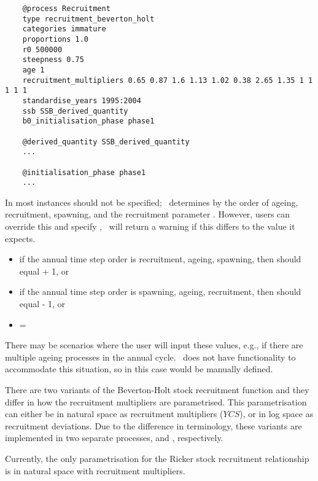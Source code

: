 {\small{\begin{verbatim}
	@process Recruitment
	type recruitment_beverton_holt
	categories immature
	proportions 1.0
	r0 500000
	steepness 0.75
	age 1
	recruitment_multipliers 0.65 0.87 1.6 1.13 1.02 0.38 2.65 1.35 1 1 1 1 1
	standardise_years 1995:2004
	ssb SSB_derived_quantity
	b0_initialisation_phase phase1
	
	@derived_quantity SSB_derived_quantity
	...
	
	@initialisation_phase phase1
	...
\end{verbatim}}}

In most instances  should not be specified; \CNAME\ determines  by the order of ageing, recruitment, spawning, and the recruitment parameter . However, users can override this and specify , \CNAME\ will return a warning if this differs to the value it expects.

\begin{itemize}
	\item if the annual time step order is recruitment, ageing, spawning, then  should equal  + 1, or
	\item if the annual time step order is spawning, ageing, recruitment, then  should equal  - 1, or
	\item {} = 
\end{itemize}

There may be scenarios where the user will input these values, e.g., if there are multiple ageing processes in the annual cycle. \CNAME\ does not have functionality to accommodate this situation, so in this case  would be manually defined.

There are two variants of the Beverton-Holt stock recruitment function and they differ in how the recruitment multipliers are parametrised. This parametrisation can either be in natural space as recruitment multipliers ($YCS$), or in log space as recruitment deviations. Due to the difference in terminology, these variants are implemented in two separate processes,  and , respectively.

Currently, the only parametrisation for the Ricker stock recruitment relationship is in natural space with recruitment multipliers.

